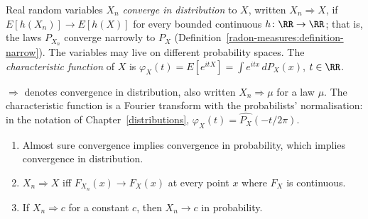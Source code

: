 \begin{definition}\label{probability:definition-convergence-distribution}
Real random variables $X_n$ \emph{converge in distribution} to $X$, written $X_n \Rightarrow X$, if $E[h(X_n)] \to E[h(X)]$ for every bounded continuous $h \colon \RR \to \RR$; that is, the laws $P_{X_n}$ converge narrowly to $P_X$
(Definition~\ref{radon-measures:definition-narrow}). The variables may live on different probability spaces. The \emph{characteristic function} of $X$ is $\varphi_X(t) = E[e^{itX}] = \int e^{itx}\,dP_X(x)$, $t \in \RR$.
\end{definition}

\begin{notation}\label{probability:notation-characteristic}
$\Rightarrow$ denotes convergence in distribution, also written $X_n \Rightarrow \mu$ for a law $\mu$. The characteristic function is a Fourier transform with the probabilists' normalisation: in the notation of
Chapter~\ref{distributions}, $\varphi_X(t) = \widehat{P_X}(-t/2\pi)$.
\end{notation}

\begin{proposition}\label{probability:proposition-convergence-distribution}
\begin{enumerate}
\item Almost sure convergence implies convergence in probability, which implies convergence in distribution.
\item $X_n \Rightarrow X$ iff $F_{X_n}(x) \to F_X(x)$ at every point $x$ where $F_X$ is continuous.
\item If $X_n \Rightarrow c$ for a constant $c$, then $X_n \to c$ in probability.
\end{enumerate}
\end{proposition}

